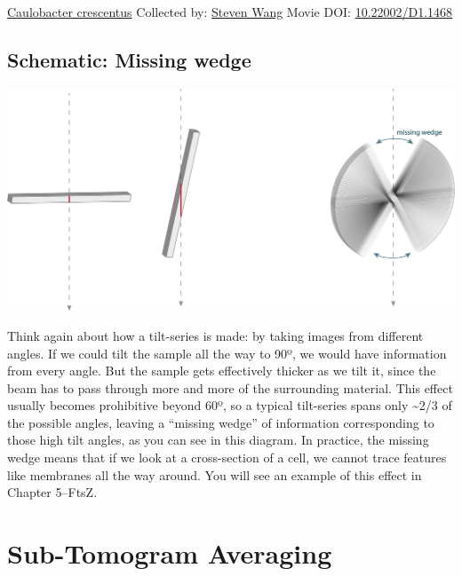 \documentclass[]{tufte-book}
\begin{document}
\hypertarget{htmlwidget-b2253dddad43b0b73396}{}

\label{fig:1-6}\protect\hyperlink{tree}{Caulobacter crescentus} Collected by: \protect\hyperlink{steven_wang}{Steven Wang} Movie DOI: \href{https://doi.org/10.22002/D1.1468}{10.22002/D1.1468}

\hypertarget{Missing_wedge}{%
\subsection*{Schematic: Missing wedge}\label{Missing_wedge}}

\includegraphics[width=20.83in]{img/schematics/1_6_1}

Think again about how a tilt-series is made: by taking images from different angles. If we could tilt the sample all the way to 90º, we would have information from every angle. But the sample gets effectively thicker as we tilt it, since the beam has to pass through more and more of the surrounding material. This effect usually becomes prohibitive beyond 60º, so a typical tilt-series spans only \textasciitilde{}2/3 of the possible angles, leaving a ``missing wedge'' of information corresponding to those high tilt angles, as you can see in this diagram. In practice, the missing wedge means that if we look at a cross-section of a cell, we cannot trace features like membranes all the way around. You will see an example of this effect in Chapter 5--FtsZ.

\hypertarget{sub-tomogram-averaging}{%
\section{Sub-Tomogram Averaging}\label{sub-tomogram-averaging}}
\end{document}
